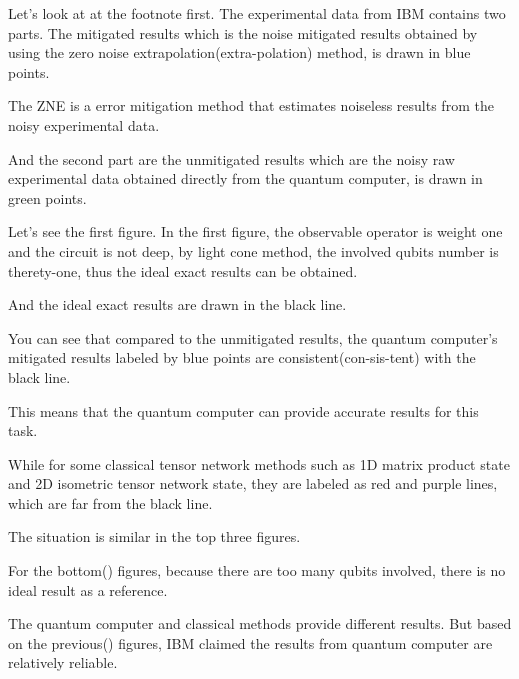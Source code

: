 \documentclass[10pt]{beamer}
\begin{document}
\begin{CJK}{UTF8}{gbsn}
{ Let's look at at the footnote first.
 The experimental data from IBM contains two parts.
  The mitigated results which is the noise mitigated results obtained by using the zero noise extrapolation(extra-polation) method, is drawn in blue points.
  
The ZNE is a error mitigation method that estimates noiseless results from the noisy experimental data.

And the second part are the unmitigated results which are the noisy raw experimental data obtained directly from the quantum computer, is drawn in green points.


Let's see the first figure. 
In the first figure, the observable operator is weight one and the circuit is not deep, by light cone method, the involved qubits number is therety-one, thus the ideal exact results can be obtained.

  
 And the ideal exact results are drawn in the black line.

 
  You can see that compared to the unmitigated results, the quantum computer's mitigated results labeled by blue points are consistent(con-sis-tent) with the black line.

  This means that the quantum computer can provide accurate results for this task.

  While for some classical tensor network methods such as 1D matrix product state and 2D isometric tensor network state, they are labeled as red and purple lines, which are far from the black line.

  The situation is similar in the top three figures.




  For the bottom() figures, because there are too many qubits involved, there is no ideal result as a reference.
 
  The quantum computer and classical methods provide different results. But based on the previous() figures, IBM claimed the results from quantum computer are relatively reliable.
  
  


}




\end{CJK}
\end{document}

